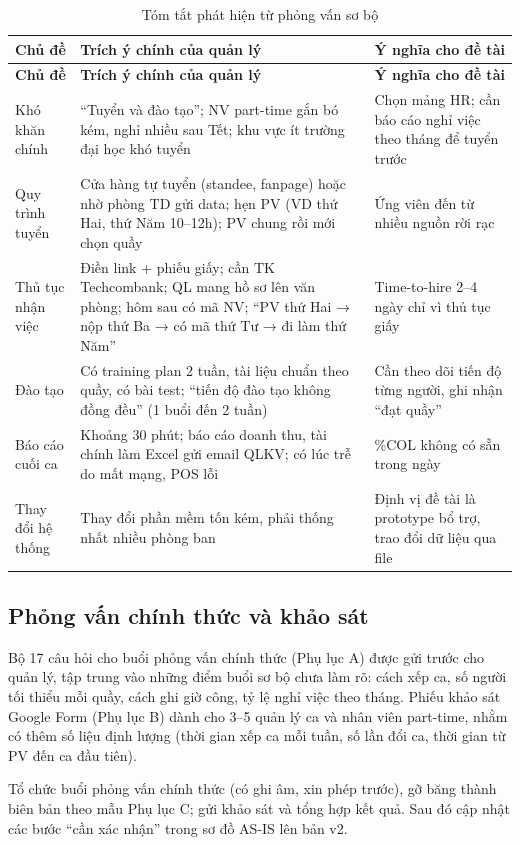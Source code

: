 \documentclass[12pt,a4paper,oneside]{report}
\begin{document}
\begin{longtable}{L{2.6cm}L{6.6cm}L{5.2cm}}
\caption{Tóm tắt phát hiện từ phỏng vấn sơ bộ}\label{tab:phathien}\\
\toprule \textbf{Chủ đề} & \textbf{Trích ý chính của quản lý} & \textbf{Ý nghĩa cho đề tài} \\\midrule\endfirsthead
\toprule \textbf{Chủ đề} & \textbf{Trích ý chính của quản lý} & \textbf{Ý nghĩa cho đề tài} \\\midrule\endhead
Khó khăn chính & ``Tuyển và đào tạo''; NV part-time gắn bó kém, nghỉ nhiều sau Tết; khu vực ít trường đại học khó tuyển & Chọn mảng HR; cần báo cáo nghỉ việc theo tháng để tuyển trước \\
Quy trình tuyển & Cửa hàng tự tuyển (standee, fanpage) hoặc nhờ phòng TD gửi data; hẹn PV (VD thứ Hai, thứ Năm 10–12h); PV chung rồi mới chọn quầy & Ứng viên đến từ nhiều nguồn rời rạc \\
Thủ tục nhận việc & Điền link + phiếu giấy; cần TK Techcombank; QL mang hồ sơ lên văn phòng; hôm sau có mã NV; ``PV thứ Hai → nộp thứ Ba → có mã thứ Tư → đi làm thứ Năm'' & Time-to-hire 2–4 ngày chỉ vì thủ tục giấy \\
Đào tạo & Có training plan 2 tuần, tài liệu chuẩn theo quầy, có bài test; ``tiến độ đào tạo không đồng đều'' (1 buổi đến 2 tuần) & Cần theo dõi tiến độ từng người, ghi nhận ``đạt quầy'' \\
Báo cáo cuối ca & Khoảng 30 phút; báo cáo doanh thu, tài chính làm Excel gửi email QLKV; có lúc trễ do mất mạng, POS lỗi & \%COL không có sẵn trong ngày \\
Thay đổi hệ thống & Thay đổi phần mềm tốn kém, phải thống nhất nhiều phòng ban & Định vị đề tài là prototype bổ trợ, trao đổi dữ liệu qua file \\
\bottomrule
\end{longtable}

\subsection{Phỏng vấn chính thức và khảo sát}
Bộ 17 câu hỏi cho buổi phỏng vấn chính thức (Phụ lục A) được gửi trước cho quản lý, tập trung vào những điểm buổi sơ bộ chưa làm rõ: cách xếp ca, số người tối thiểu mỗi quầy, cách ghi giờ công, tỷ lệ nghỉ việc theo tháng. Phiếu khảo sát Google Form (Phụ lục B) dành cho 3–5 quản lý ca và nhân viên part-time, nhằm có thêm số liệu định lượng (thời gian xếp ca mỗi tuần, số lần đổi ca, thời gian từ PV đến ca đầu tiên).

\begin{canxacnhan}
Tổ chức buổi phỏng vấn chính thức (có ghi âm, xin phép trước), gỡ băng thành biên bản theo mẫu Phụ lục C; gửi khảo sát và tổng hợp kết quả. Sau đó cập nhật các bước ``cần xác nhận'' trong sơ đồ AS-IS lên bản v2.
\end{canxacnhan}
\end{document}
